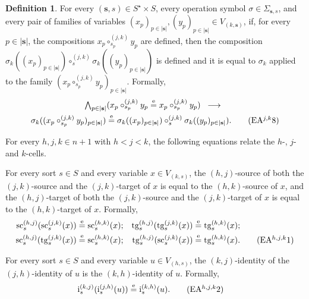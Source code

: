 \documentclass{amsart}
\theoremstyle{plain}
\theoremstyle{definition}
\newtheorem{definition}[theorem]{Definition}
\begin{document}
\begin{definition}
For every $(\mathbf{s},s)\in S^{\star}\times S$, every operation symbol $\sigma\in \Sigma_{\mathbf{s},s}$, and every pair of families of variables $(x_{p})_{p\in \lvert\mathbf{s}\rvert}, (y_{p})_{p\in \lvert\mathbf{s}\rvert}\in V_{(k,\mathbf{s})}$, if, for every $p\in \lvert\mathbf{s}\rvert$, the compositions $x_{p}\circ^{(j,k)}_{s_{p}}y_{p}$ are defined, then the composition $\sigma_{k}((x_{p})_{p\in \lvert\mathbf{s}\rvert})\circ^{(j,k)}_{s}\sigma_{k}((y_{p})_{p\in \lvert\mathbf{s}\rvert})$ is defined and it is equal to $\sigma_{k}$ applied to the family $(x_{p}\circ^{(j,k)}_{s_{p}}y_{p})_{p\in \lvert\mathbf{s}\rvert}$. Formally,
\allowdisplaybreaks
\begin{multline*}
\textstyle
\bigwedge_{p\in \lvert\mathbf{s}\rvert}
(x_{p}\circ^{(j,k)}_{s_{p}} y_{p}\overset{\mathrm{e}}{=}x_{p}\circ^{(j,k)}_{s_{p}} y_{p})
\;\;\longrightarrow\;\;\\
\sigma_{k}((x_{p}\circ^{(j,k)}_{s_{p}}y_{p})_{p\in \lvert\mathbf{s}\rvert})
\overset{\mathrm{e}}{=}
\sigma_{k}((x_{p})_{p\in \lvert\mathbf{s}\rvert})\circ^{(j,k)}_{s}\sigma_{k}((y_{p})_{p\in \lvert\mathbf{s}\rvert}).
\label{DVarExtendedEAjk8}\tag{EA$^{j,k}$8}
\end{multline*}

For every $h,j,k\in n+1$ with $h<j<k$, the following equations relate the $h$-, $j$- and $k$-cells.

For every sort $s\in S$ and every variable $x\in V_{(k,s)}$, the $(h,j)$-source of both the $(j,k)$-source and the $(j,k)$-target of $x$ is equal to the $(h,k)$-source of $x$, and the $(h,j)$-target of both the $(j,k)$-source and the $(j,k)$-target of $x$ is equal to the $(h,k)$-target of $x$. Formally,
\allowdisplaybreaks
\begin{align*}
\mathrm{sc}^{(h,j)}_{s}(\mathrm{sc}^{(j,k)}_{s}(x))&\overset{\mathrm{e}}{=}\mathrm{sc}^{(h,k)}_{s}(x);
&
\mathrm{tg}^{(h,j)}_{s}(\mathrm{tg}^{(j,k)}_{s}(x))&\overset{\mathrm{e}}{=}\mathrm{tg}^{(h,k)}_{s}(x);\\
\mathrm{sc}^{(h,j)}_{s}(\mathrm{tg}^{(j,k)}_{s}(x))&\overset{\mathrm{e}}{=}\mathrm{sc}^{(h,k)}_{s}(x);
&
\mathrm{tg}^{(h,j)}_{s}(\mathrm{sc}^{(j,k)}_{s}(x))&\overset{\mathrm{e}}{=}\mathrm{tg}^{(h,k)}_{s}(x).\label{DVarExtendedEAhjk1}\tag{EA$^{h,j,k}$1}
\end{align*}

For every sort $s\in S$ and every variable $u\in V_{(h,s)}$, the $(k,j)$-identity of the $(j,h)$-identity of $u$ is the $(k,h)$-identity of $u$. Formally,
\allowdisplaybreaks
\begin{align*}
\mathrm{i}^{(k,j)}_{s}(\mathrm{i}^{(j,h)}_{s}(u))&\overset{\mathrm{e}}{=}\mathrm{i}^{(k,h)}_{s}(u).\label{DVarExtendedEAhjk2}\tag{EA$^{h,j,k}$2}
\end{align*}


\end{definition}
\end{document}
